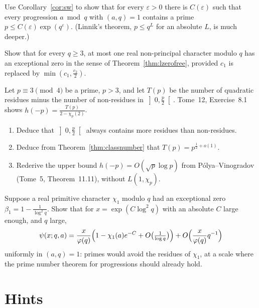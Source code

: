 \begin{exercise}[$\star\star$]\label{ex:leastprime}
Use Corollary~\ref{cor:sw} to show that for every $\varepsilon>0$ there is $C(\varepsilon)$ such that every progression $a\bmod q$ with $(a,q)=1$ contains a prime $p\le C(\varepsilon)\exp(q^\varepsilon)$. (Linnik's theorem, $p\le q^L$ for an absolute $L$, is much deeper.)
\end{exercise}

\begin{exercise}[$\star\star$]\label{ex:onebad}
Show that for every $q\ge3$, at most one real non-principal character modulo $q$ has an exceptional zero in the sense of Theorem~\ref{thm:lzerofree}, provided $c_1$ is replaced by $\min(c_1,\frac{c_2}2)$.
\end{exercise}

\begin{exercise}[$\star\star$]\label{ex:hupper}
Let $p\equiv3\pmod4$ be a prime, $p>3$, and let $T(p)$ be the number of quadratic residues minus the number of non-residues in $\left]0,\frac p2\right[$. Tome~12, Exercise~8.1 shows $h(-p)=\frac{T(p)}{2-\chi_p(2)}$.
\begin{enumerate}
\item Deduce that $\left]0,\frac p2\right[$ always contains more residues than non-residues.
\item Deduce from Theorem~\ref{thm:classnumber} that $T(p)=p^{\frac12+o(1)}$.
\item Rederive the upper bound $h(-p)=O(\sqrt p\log p)$ from Pólya--Vinogradov (Tome~5, Theorem~11.11), without $L(1,\chi_p)$.
\end{enumerate}
\end{exercise}

\begin{exercise}[$\star\star\star$]\label{ex:bias}
Suppose a real primitive character $\chi_1$ modulo $q$ had an exceptional zero $\beta_1=1-\frac1{\log^2q}$. Show that for $x=\exp(C\log^2q)$ with an absolute $C$ large enough, and $q$ large,
\[
\psi(x;q,a)=\frac x{\varphi(q)}\Bigl(1-\chi_1(a)e^{-C}+O\bigl(\tfrac1{\log q}\bigr)\Bigr)+O\Bigl(\frac{x}{\varphi(q)}q^{-1}\Bigr)
\]
uniformly in $(a,q)=1$: primes would avoid the residues of $\chi_1$, at a scale where the prime number theorem for progressions should already hold.
\end{exercise}

\section{Hints}

